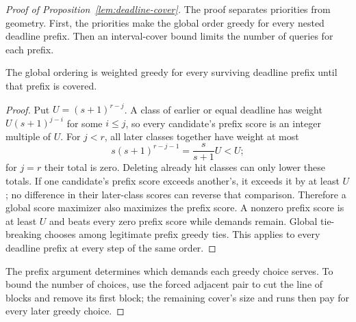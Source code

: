 \begin{proof}[Proof of Proposition~\ref{lem:deadline-cover}]
The proof separates priorities from geometry. First, the priorities
make the global order greedy for every nested deadline prefix. Then
an interval-cover bound limits the number of queries for each prefix.

\begin{claim}
\label{clm:deadline-priority-prefix}
The global ordering is weighted greedy for every surviving deadline
prefix until that prefix is covered.
\end{claim}
\begin{proof}
Put $U=(s+1)^{r-j}$. A class of earlier or equal deadline has
weight $U(s+1)^{j-i}$ for some $i\le j$, so every candidate's
prefix score is an integer multiple of $U$. For $j<r$, all later
classes together have weight at most
\[
 s(s+1)^{r-j-1}=\frac{s}{s+1}U<U;
\]
for $j=r$ their total is zero. Deleting already hit classes can only
lower these totals. If one candidate's prefix score exceeds another's,
it exceeds it by at least $U$; no difference in their later-class
scores can reverse that comparison. Therefore a global score maximizer
also maximizes the prefix score. A nonzero prefix score is at least
$U$ and beats every zero prefix score while demands remain. Global
tie-breaking chooses among legitimate prefix greedy ties.
This applies to every deadline prefix at every step of the same order.
\end{proof}
The prefix argument determines which demands each greedy choice serves.
To bound the number of choices, use the forced adjacent pair to cut the
line of blocks and remove its first block; the remaining cover's size
and runs then pay for every later greedy choice.


\end{proof}
